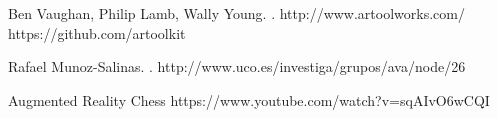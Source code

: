\documentclass[pdflatex,11pt]{aghdpl}
\author{Ksawery Głaz}
\date{2016}
\begin{document}
\titlepages

\tableofcontents
\clearpage









% 
% 



\begin{thebibliography}{1}

Ben Vaughan, Philip Lamb, Wally Young.
.
\newblock http://www.artoolworks.com/
\newblock https://github.com/artoolkit

Rafael Munoz-Salinas.
.
\newblock http://www.uco.es/investiga/grupos/ava/node/26

Augmented Reality Chess
\newblock https://www.youtube.com/watch?v=sqAIvO6wCQI


\end{thebibliography}
\end{document}
